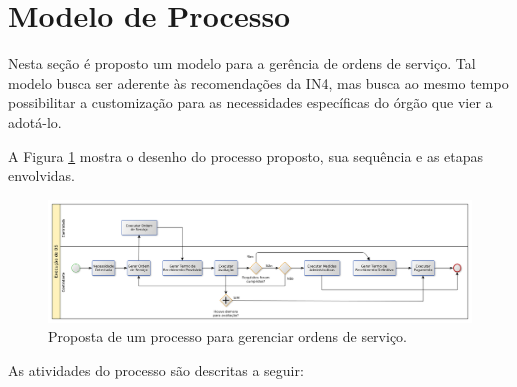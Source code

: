 \section{Modelo de Processo}

Nesta seção é proposto um modelo para a gerência de ordens de serviço. Tal
modelo busca ser aderente às recomendações da IN4, mas busca ao mesmo tempo
possibilitar a customização para as necessidades específicas do órgão que vier
a adotá-lo.

A Figura \ref{fig:so_process} mostra o desenho do processo proposto, sua
sequência e as etapas envolvidas.

\begin{figure}[H]
  \centering
  \includegraphics[keepaspectratio=true,scale=0.5]{figures/so_process}
  \caption{Proposta de um processo para gerenciar ordens de serviço.}
  \label{fig:so_process}
\end{figure}

As atividades do processo são descritas a seguir:

